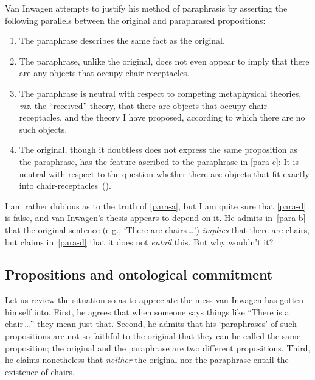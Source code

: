 \documentclass[11pt]{article}
\begin{document}
\begin{spacing}{1.5}
Van Inwagen attempts to justify his method of paraphrasis by asserting
the following parallels between the original and paraphrased
propositions:
\begin{enumerate}[label=(\Alph*)]
	\item The paraphrase describes the same fact as the
          original.  \label{para-a}
	\item The paraphrase, unlike the original, does not even
          appear to imply that there are any objects that occupy
          chair-receptacles.  \label{para-b}
	\item The paraphrase is neutral with respect to competing
          metaphysical theories, {\em viz}.  the ``received'' theory,
          that there are objects that occupy chair-receptacles, and
          the theory I have proposed, according to which there are no
          such objects.  \label{para-c}
	\item The original, though it doubtless does not express the
          same proposition as the paraphrase, has the feature ascribed
          to the paraphrase in \ref{para-c}: It is neutral with
          respect to the question whether there are objects that fit
          exactly into
          chair-receptacles~(\citeyear[113]{inwagen1995}).  \label{para-d}
\end{enumerate}
I am rather dubious as to the truth of \ref{para-a}, but I am quite
sure that \ref{para-d} is false, and van Inwagen's thesis appears to
depend on it.  He admits in~\ref{para-b} that the original sentence
(e.g., `There are chairs\,\ldots ') {\em implies} that there are
chairs, but claims in~\ref{para-d} that it does not {\em entail} this.
But why wouldn't it?

\subsection{Propositions and ontological commitment}
Let us review the situation so as to appreciate the mess van Inwagen
has gotten himself into.  First, he agrees that when someone says
things like ``There is a chair\,\ldots '' they mean just that.
Second, he admits that his `paraphrases' of such propositions are not
so faithful to the original that they can be called the same
proposition; the original and the paraphrase are two different
propositions.  Third, he claims nonetheless that {\em neither} the
original nor the paraphrase entail the existence of chairs.


\end{spacing}
\end{document}
